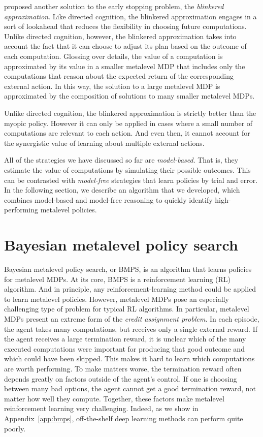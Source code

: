 \citet{hay2012selecting} proposed another solution to the early stopping problem, the \emph{blinkered approximation}. Like directed cognition, the blinkered approximation engages in a sort of lookahead that reduces the flexibility in choosing future computations. Unlike directed cognition, however, the blinkered approximation takes into account the fact that it can choose to adjust its plan based on the outcome of each computation. Glossing over details, the value of a computation is approximated by its value in a smaller metalevel MDP that includes only the computations that reason about the expected return of the corresponding external action. In this way, the solution to a large metalevel MDP is approximated by the composition of solutions to many smaller metalevel MDPs. 

Unlike directed cognition, the blinkered approximation is strictly better than the myopic policy. However it can only be applied in cases where a small number of computations are relevant to each action. And even then, it cannot account for the synergistic value of learning about multiple external actions. 

\separator

All of the strategies we have discussed so far are \emph{model-based}. That is, they estimate the value of computations by simulating their possible outcomes. This can be contrasted with \emph{model-free} strategies that learn policies by trial and error. In the following section, we describe an algorithm that we developed, which combines model-based and model-free reasoning to quickly identify high-performing metalevel policies.


\section{Bayesian metalevel policy search}\label{sec:bmps}

Bayesian metalevel policy search, or BMPS, is an algorithm that learns policies for metalevel MDPs. At its core, BMPS is a reinforcement learning (RL) algorithm. And in principle, any reinforcement-learning method could be applied to learn metalevel policies. However, metalevel MDPs pose an especially challenging type of problem for typical RL algorithms. In particular, metalevel MDPs present an extreme form of the \emph{credit assignment problem}. In each episode, the agent takes many computations, but receives only a single external reward. If the agent receives a large termination reward, it is unclear which of the many executed computations were important for producing that good outcome and which could have been skipped. This makes it hard to learn which computations are worth performing. To make matters worse, the termination reward often depends greatly on factors outside of the agent's control. If one is choosing between many bad options, the agent cannot get a good termination reward, not matter how well they compute. Together, these factors make metalevel reinforcement learning very challenging. Indeed, as we show in Appendix~\ref{app:bmps}, off-the-shelf deep learning methods can perform quite poorly.

